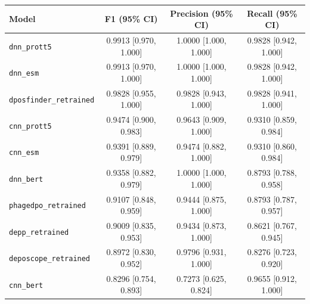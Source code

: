 \begin{tabular}{lccc}
\toprule
Model & F1 (95\% CI) & Precision (95\% CI) & Recall (95\% CI) \\
\midrule
\texttt{dnn\_prott5} & 0.9913 [0.970, 1.000] & 1.0000 [1.000, 1.000] & 0.9828 [0.942, 1.000] \\
\texttt{dnn\_esm} & 0.9913 [0.970, 1.000] & 1.0000 [1.000, 1.000] & 0.9828 [0.942, 1.000] \\
\texttt{dposfinder\_retrained} & 0.9828 [0.955, 1.000] & 0.9828 [0.943, 1.000] & 0.9828 [0.941, 1.000] \\
\texttt{cnn\_prott5} & 0.9474 [0.900, 0.983] & 0.9643 [0.909, 1.000] & 0.9310 [0.859, 0.984] \\
\texttt{cnn\_esm} & 0.9391 [0.889, 0.979] & 0.9474 [0.882, 1.000] & 0.9310 [0.860, 0.984] \\
\texttt{dnn\_bert} & 0.9358 [0.882, 0.979] & 1.0000 [1.000, 1.000] & 0.8793 [0.788, 0.958] \\
\texttt{phagedpo\_retrained} & 0.9107 [0.848, 0.959] & 0.9444 [0.875, 1.000] & 0.8793 [0.787, 0.957] \\
\texttt{depp\_retrained} & 0.9009 [0.835, 0.953] & 0.9434 [0.873, 1.000] & 0.8621 [0.767, 0.945] \\
\texttt{deposcope\_retrained} & 0.8972 [0.830, 0.952] & 0.9796 [0.931, 1.000] & 0.8276 [0.723, 0.920] \\
\texttt{cnn\_bert} & 0.8296 [0.754, 0.893] & 0.7273 [0.625, 0.824] & 0.9655 [0.912, 1.000] \\
\bottomrule
\end{tabular}
